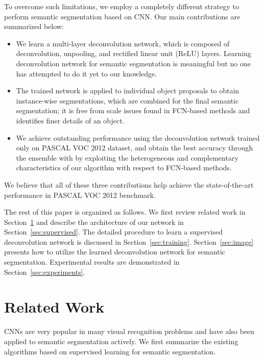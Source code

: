 \documentclass[10pt,twocolumn,letterpaper]{article}
\begin{document}
To overcome such limitations, we employ a completely different strategy to perform semantic segmentation based on CNN.
Our main contributions are summarized below:
\begin{itemize}
\item We learn a multi-layer deconvolution network, which is composed of deconvolution, unpooling, and rectified linear unit (ReLU) layers.
Learning deconvolution network for semantic segmentation is meaningful but no one has attempted to do it yet to our knowledge.
\item The trained network is applied to individual object proposals to obtain instance-wise segmentations, which are combined for the final semantic segmentation; it is free from scale issues found in FCN-based methods and identifies finer details of an object.
\item We achieve outstanding performance using the deconvolution network trained only on PASCAL VOC 2012 dataset, and obtain the best accuracy through the ensemble with \cite{Fcn} by exploiting the heterogeneous and complementary characteristics of our algorithm with respect to FCN-based methods.
\end{itemize}
We believe that all of these three contributions help achieve the state-of-the-art performance in PASCAL VOC 2012 benchmark.


\iffalse
We tackle this problem through object-wise shape prediction. 
Rather than using CNN as a pixel classifier, we defined the CNN architecture called supervised deconvolution network ~\cite{Sds} generating object class and shape prediction map which is correspondingly-sized with its input. 
By doing so, we are able to obtain fine resolution segmentation result of each objects even when whole object is reside in the single receptive field of the network. 
\fi

The rest of this paper is organized as follows. 
We first review related work in Section~\ref{sec:related} and describe the architecture of our network in Section~\ref{sec:supervised}.
The detailed procedure to learn a supervised deconvolution network is discussed in Section~\ref{sec:training}. 
Section~\ref{sec:image} presents how to utilize the learned deconvolution network for semantic segmentation. 
Experimental results are demonstrated in Section~\ref{sec:experiments}. 


\section{Related Work}
\label{sec:related}
CNNs are very popular in many visual recognition problems and have also been applied to semantic segmentation actively.
We first summarize the existing algorithms based on supervised learning for semantic segmentation.
\end{document}
